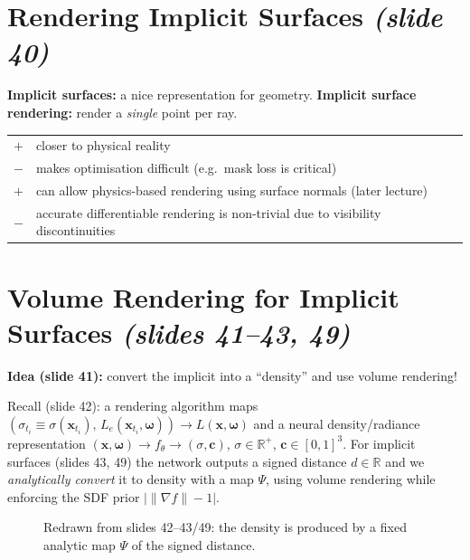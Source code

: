 \documentclass[11pt,a4paper]{article}
\newcommand{\R}{\mathbb{R}}
\newcommand{\bx}{\bm{x}}
\newcommand{\bc}{{\bm{c}}}
\newcommand{\bom}{{\bm{\omega}}}
\theoremstyle{definition}
\theoremstyle{plain}
\theoremstyle{remark}
\begin{document}
\section{Rendering Implicit Surfaces \emph{(slide 40)}}
\textbf{Implicit surfaces:} a nice representation for geometry. \textbf{Implicit surface rendering:} render a \emph{single}
point per ray.
\begin{center}
\begin{tabular}{@{}cp{11cm}@{}}
\textcolor{green!50!black}{$+$} & closer to physical reality\\
\textcolor{red!70!black}{$-$} & makes optimisation difficult (e.g.\ mask loss is critical)\\
\textcolor{green!50!black}{$+$} & can allow physics-based rendering using surface normals (later lecture)\\
\textcolor{red!70!black}{$-$} & accurate differentiable rendering is non-trivial due to visibility discontinuities
\end{tabular}
\end{center}

\section{Volume Rendering for Implicit Surfaces \emph{(slides 41--43, 49)}}
\textbf{Idea (slide 41):} convert the implicit into a ``density'' and use volume rendering!

Recall (slide 42): a rendering algorithm maps $(\sigma_{t_i}\equiv\sigma(\bx_{t_i}),\,L_e(\bx_{t_i},\bom))\to L(\bx,\bom)$ and
a neural density/radiance representation $(\bx,\bom)\to f_\theta\to(\sigma,\bc)$, $\sigma\in\R^+$, $\bc\in[0,1]^3$.
For implicit surfaces (slides 43, 49) the network outputs a signed distance $d\in\R$ and we \emph{analytically
convert} it to density with a map $\Psi$, using volume rendering while enforcing the SDF prior $\bigl|\|\nabla f\|-1\bigr|$.

\begin{figure}[htbp]
\centering
{}
\caption{Redrawn from slides 42--43/49: the density is produced by a fixed analytic map $\Psi$ of the signed distance.}
\end{figure}
\end{document}
